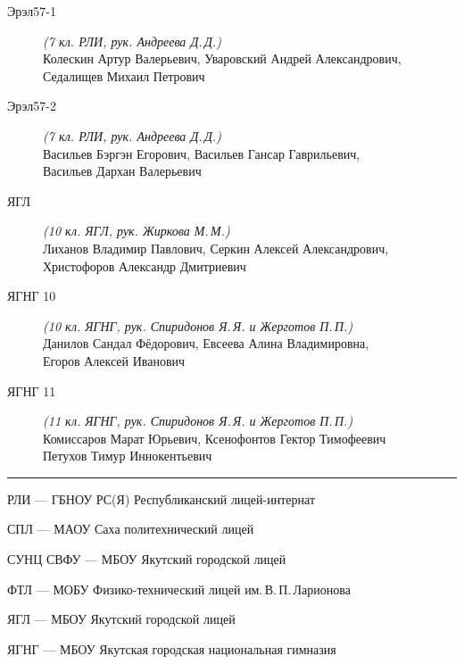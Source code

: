 \begin{description}
\item[Эрэл57-1] \textit{(7 кл. РЛИ, рук. Андреева Д.\,Д.)} \\
Колескин Артур Валерьевич, Уваровский Андрей Александрович, \\
Седалищев Михаил Петрович

\item[Эрэл57-2] \textit{(7 кл. РЛИ, рук. Андреева Д.\,Д.)} \\
Васильев Бэргэн Егорович, Васильев Гансар Гаврильевич, \\
Васильев Дархан Валерьевич

\item[ЯГЛ] \textit{(10 кл. ЯГЛ, рук. Жиркова М.\,М.)} \\
Лиханов Владимир Павлович, Серкин Алексей Александрович, \\
Христофоров Александр Дмитриевич

\item[ЯГНГ 10] \textit{(10 кл. ЯГНГ, рук. Спиридонов Я.\,Я. и Жерготов П.\,П.)} \\
Данилов Сандал Фёдорович, Евсеева Алина Владимировна, \\
Егоров Алексей Иванович

\item[ЯГНГ 11] \textit{(11 кл. ЯГНГ, рук. Спиридонов Я.\,Я. и Жерготов П.\,П.)} \\
Комиссаров Марат Юрьевич, Ксенофонтов Гектор Тимофеевич \\
Петухов Тимур Иннокентьевич

\end{description}

\noindent\rule{3cm}{0.4pt}

\noindent РЛИ --- ГБНОУ РС(Я) Республиканский лицей-интернат

\noindent СПЛ --- МАОУ Саха политехнический лицей

\noindent СУНЦ СВФУ --- МБОУ Якутский городской лицей

\noindent ФТЛ --- МОБУ Физико-технический лицей им.\,В.\,П.\,Ларионова

\noindent ЯГЛ --- МБОУ Якутский городской лицей

\noindent ЯГНГ --- МБОУ Якутская городская национальная гимназия

